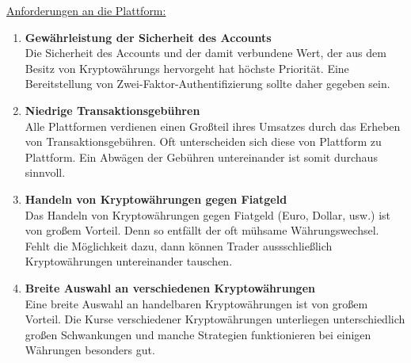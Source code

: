 \documentclass[oneside]{ausarbeitung}
\begin{document}
\underline{Anforderungen an die Plattform:}
\begin{enumerate}
	\item \textbf{Gewährleistung der Sicherheit des Accounts} \\
		Die Sicherheit des Accounts und der damit 
		verbundene Wert, der aus dem Besitz von Kryptowährungs hervorgeht hat
		höchste Priorität. Eine Bereitstellung von Zwei-Faktor-Authentifizierung
		sollte daher gegeben sein.
	\item \textbf{Niedrige Transaktionsgebühren} \\
		Alle Plattformen verdienen einen Großteil ihres Umsatzes durch das
		Erheben von Transaktionsgebühren. Oft unterscheiden sich diese von
		Plattform zu Plattform. Ein Abwägen der Gebühren untereinander ist
		somit durchaus sinnvoll.
	\item \textbf{Handeln von Kryptowährungen gegen Fiatgeld} \\
		Das Handeln von Kryptowährungen gegen Fiatgeld (Euro, Dollar, usw.)
		ist von großem Vorteil. Denn so entfällt der oft mühsame Währungswechsel. 
		Fehlt die Möglichkeit dazu, dann können Trader aussschließlich
		Kryptowährungen untereinander tauschen.
	\item \textbf{Breite Auswahl an verschiedenen Kryptowährungen} \\
		Eine breite Auswahl an handelbaren Kryptowährungen ist von großem
		Vorteil. Die Kurse verschiedener Kryptowährungen unterliegen
		unterschiedlich großen Schwankungen und manche Strategien funktionieren
		bei einigen Währungen besonders gut. \\
\end{enumerate}
\end{document}
